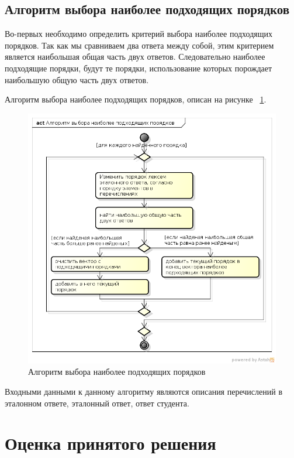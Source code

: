 \documentclass[a4paper,english,russian]{G2-105}
\begin{document}
\subsection{Алгоритм выбора наиболее подходящих порядков}

\par Во-первых необходимо определить критерий выбора наиболее подходящих порядков. Так как мы сравниваем два ответа между собой, этим критерием является наибольшая общая часть двух ответов. Следовательно наиболее подходящие порядки, будут те порядки, использование которых порождает наибольшую общую часть двух ответов.
\par Алгоритм выбора наиболее подходящих порядков, описан на рисунке ~\ref{avnpp}.
\newpage
\begin{figure}
    \includegraphics[height = 0.5\paperheight ,width=\linewidth]{avnpp.png}
    \caption{Алгоритм выбора наиболее подходящих порядков}
	\label{avnpp}
\end{figure}
\par Входными данными к данному алгоритму являются описания перечислений в эталонном ответе, эталонный ответ, ответ студента.

\section{Оценка принятого решения}
\end{document}
